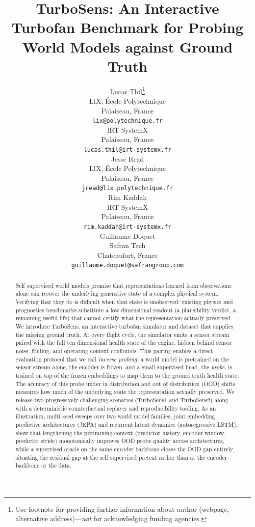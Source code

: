 \documentclass{article}
\title{TurboSens: An Interactive Turbofan Benchmark for Probing World Models %
against Ground Truth}
\author{%
  Lucas Thil\thanks{Use footnote for providing further information about author (webpage, alternative address)---\emph{not} for acknowledging funding agencies.} \\
  LIX, École Polytechnique \\
  Palaiseau, France \\
  \texttt{lix@polytechnique.fr} \\
  \And
  IRT SystemX \\
  Palaiseau, France \\
  \texttt{lucas.thil@irt-systemx.fr} \\
  \AND
  Jesse Read \\
  LIX, École Polytechnique \\
  Palaiseau, France \\
  \texttt{jread@lix.polytechnique.fr} \\
  \AND
  Rim Kaddah \\
  IRT SystemX \\
  Palaiseau, France \\
  \texttt{rim.kaddah@irt-systemx.fr} \\
  \AND
  Guillaume Doquet \\
  Safran Tech \\
  Chateaufort, France \\
  \texttt{guillaume.doquet@safrangroup.com} \\
}
\begin{document}
\maketitle


\begin{abstract}
Self supervised world models promise that representations learned from observations alone can recover the underlying generative state of a complex physical system. Verifying that they do is difficult when that state is unobserved: existing physics and prognostics benchmarks substitute a low dimensional readout (a plausibility verdict, a remaining useful life) that cannot certify what the representation actually preserved. We introduce TurboSens, an interactive turbofan simulator and dataset that supplies the missing ground truth. At every flight cycle, the simulator emits a sensor stream paired with the full ten dimensional health state of the engine, hidden behind sensor noise, fouling, and operating context confounds. This pairing enables a direct evaluation protocol that we call \emph{inverse probing}: a world model is pretrained on the sensor stream alone, the encoder is frozen, and a small supervised head, the \emph{probe}, is trained on top of the frozen embeddings to map them to the ground truth health state. The accuracy of this probe under in distribution and out of distribution (OOD) shifts measures how much of the underlying state the representation actually preserved. We release two progressively challenging scenarios (TurboSens1 and TurboSens2) along with a deterministic counterfactual replayer and reproducibility tooling. As an illustration, multi seed sweeps over two world model families, joint embedding predictive architectures (JEPA) and recurrent latent dynamics (autoregressive LSTM), show that lengthening the pretraining context (predictor history, encoder window, predictor stride) monotonically improves OOD probe quality across architectures, while a supervised oracle on the same encoder backbone closes the OOD gap entirely, situating the residual gap at the self supervised pretext rather than at the encoder backbone or the data.



\end{abstract}
\end{document}
